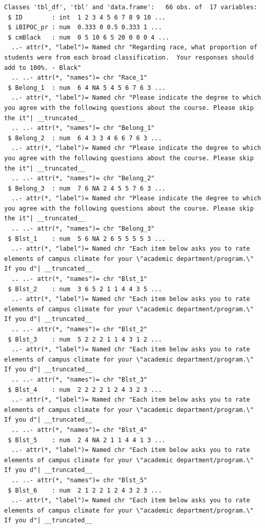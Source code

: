 \documentclass[
  11pt,
]{book}
\begin{document}
\begin{verbatim}
Classes 'tbl_df', 'tbl' and 'data.frame':   66 obs. of  17 variables:
 $ ID        : int  1 2 3 4 5 6 7 8 9 10 ...
 $ iBIPOC_pr : num  0.333 0 0.5 0.333 1 ...
 $ cmBlack   : num  0 5 10 6 5 20 0 0 0 4 ...
  ..- attr(*, "label")= Named chr "Regarding race, what proportion of students were from each broad classification.  Your responses should add to 100%. - Black"
  .. ..- attr(*, "names")= chr "Race_1"
 $ Belong_1  : num  6 4 NA 5 4 5 6 7 6 3 ...
  ..- attr(*, "label")= Named chr "Please indicate the degree to which you agree with the following questions about the course. Please skip the it"| __truncated__
  .. ..- attr(*, "names")= chr "Belong_1"
 $ Belong_2  : num  6 4 3 3 4 6 6 7 6 3 ...
  ..- attr(*, "label")= Named chr "Please indicate the degree to which you agree with the following questions about the course. Please skip the it"| __truncated__
  .. ..- attr(*, "names")= chr "Belong_2"
 $ Belong_3  : num  7 6 NA 2 4 5 5 7 6 3 ...
  ..- attr(*, "label")= Named chr "Please indicate the degree to which you agree with the following questions about the course. Please skip the it"| __truncated__
  .. ..- attr(*, "names")= chr "Belong_3"
 $ Blst_1    : num  5 6 NA 2 6 5 5 5 5 3 ...
  ..- attr(*, "label")= Named chr "Each item below asks you to rate elements of campus climate for your \"academic department/program.\"  If you d"| __truncated__
  .. ..- attr(*, "names")= chr "Blst_1"
 $ Blst_2    : num  3 6 5 2 1 1 4 4 3 5 ...
  ..- attr(*, "label")= Named chr "Each item below asks you to rate elements of campus climate for your \"academic department/program.\"  If you d"| __truncated__
  .. ..- attr(*, "names")= chr "Blst_2"
 $ Blst_3    : num  5 2 2 2 1 1 4 3 1 2 ...
  ..- attr(*, "label")= Named chr "Each item below asks you to rate elements of campus climate for your \"academic department/program.\"  If you d"| __truncated__
  .. ..- attr(*, "names")= chr "Blst_3"
 $ Blst_4    : num  2 2 2 2 1 2 4 3 2 3 ...
  ..- attr(*, "label")= Named chr "Each item below asks you to rate elements of campus climate for your \"academic department/program.\"  If you d"| __truncated__
  .. ..- attr(*, "names")= chr "Blst_4"
 $ Blst_5    : num  2 4 NA 2 1 1 4 4 1 3 ...
  ..- attr(*, "label")= Named chr "Each item below asks you to rate elements of campus climate for your \"academic department/program.\"  If you d"| __truncated__
  .. ..- attr(*, "names")= chr "Blst_5"
 $ Blst_6    : num  2 1 2 2 1 2 4 3 2 3 ...
  ..- attr(*, "label")= Named chr "Each item below asks you to rate elements of campus climate for your \"academic department/program.\"  If you d"| __truncated__

\end{verbatim}
\end{document}
